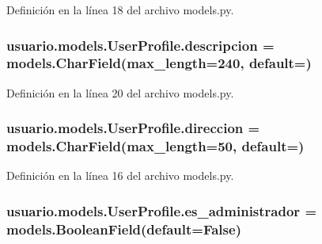 Definición en la línea 18 del archivo models.\+py.

\subsubsection[{\texorpdfstring{descripcion}{descripcion}}]{\setlength{\rightskip}{0pt plus 5cm}usuario.\+models.\+User\+Profile.\+descripcion = models.\+Char\+Field(max\+\_\+length=240, default=\textquotesingle{}\textquotesingle{})\hspace{0.3cm}{\ttfamily [static]}}\hypertarget{classusuario_1_1models_1_1_user_profile_a7a01376ce01bf33948434e7256ad05ff}{}\label{classusuario_1_1models_1_1_user_profile_a7a01376ce01bf33948434e7256ad05ff}


Definición en la línea 20 del archivo models.\+py.

\subsubsection[{\texorpdfstring{direccion}{direccion}}]{\setlength{\rightskip}{0pt plus 5cm}usuario.\+models.\+User\+Profile.\+direccion = models.\+Char\+Field(max\+\_\+length=50, default=\textquotesingle{}\textquotesingle{})\hspace{0.3cm}{\ttfamily [static]}}\hypertarget{classusuario_1_1models_1_1_user_profile_a9016f06733de7a060980d1bbbdb71d6b}{}\label{classusuario_1_1models_1_1_user_profile_a9016f06733de7a060980d1bbbdb71d6b}


Definición en la línea 16 del archivo models.\+py.

\subsubsection[{\texorpdfstring{es\+\_\+administrador}{es_administrador}}]{\setlength{\rightskip}{0pt plus 5cm}usuario.\+models.\+User\+Profile.\+es\+\_\+administrador = models.\+Boolean\+Field(default=False)\hspace{0.3cm}{\ttfamily [static]}}\hypertarget{classusuario_1_1models_1_1_user_profile_a543c141ad4b4e7d2aaf13b11393cd527}{}\label{classusuario_1_1models_1_1_user_profile_a543c141ad4b4e7d2aaf13b11393cd527}


